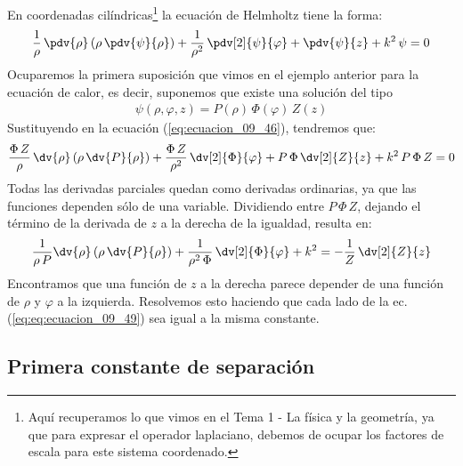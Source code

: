 En coordenadas cilíndricas\footnote{Aquí recuperamos lo que vimos en el Tema 1 - La física y la geometría, ya que para expresar el operador laplaciano, debemos de ocupar los factores de escala para este sistema coordenado.} la ecuación de Helmholtz tiene la forma:
\begin{align}
\dfrac{1}{\rho} \, \pdv{\rho} \left( \rho \, \pdv{\psi}{\rho} \right) + \dfrac{1}{\rho^{2}} \, \pdv[2]{\psi}{\varphi} + \pdv{\psi}{z} + k^{2} \, \psi = 0
\label{eq:ecuacion_09_46}
\end{align}
Ocuparemos la primera suposición que vimos en el ejemplo anterior para la ecuación de calor, es decir, suponemos que existe una solución del tipo
\begin{align}
\psi (\rho, \varphi, z) = P(\rho) \, \Phi (\varphi) \, Z(z)
\label{eq:ecuacion_09_47}
\end{align}
Sustituyendo en la ecuación (\ref{eq:ecuacion_09_46}), tendremos que:
\begin{align}
\dfrac{\Phi \, Z}{\rho} \, \dv{\rho} \left( \rho \, \dv{P}{\rho} \right) + \dfrac{\Phi \, Z}{\rho^{2}} \, \dv[2]{\Phi}{\varphi} + P \, \Phi \, \dv[2]{Z}{z} + k^{2} \, P \, \Phi \, Z = 0 
\label{eq:ecuacion_09_48}    
\end{align}
Todas las derivadas parciales quedan como derivadas ordinarias, ya que las funciones dependen sólo de una variable. Dividiendo entre $P \, \Phi \, Z$, dejando el término de la derivada de $z$ a la derecha de la igualdad, resulta en:
\begin{align}
\dfrac{1}{\rho \, P} \dv{\rho} \left( \rho \, \dv{P}{\rho} \right) + \dfrac{1}{\rho^{2} \, \Phi} \, \dv[2]{\Phi}{\varphi} + k^{2} =  - \dfrac{1}{Z} \, \dv[2]{Z}{z}
\label{eq:eq:ecuacion_09_49}
\end{align}
Encontramos que una función de $z$ a la derecha parece depender de una función de $\rho$ y $\varphi$ a la izquierda. Resolvemos esto haciendo que cada lado de la ec. (\ref{eq:eq:ecuacion_09_49}) sea igual a la misma constante.

\subsection{Primera constante de separación}

